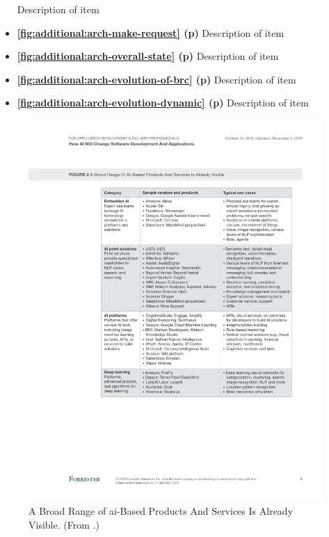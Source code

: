 \begin{itemize}
  Description of item
\item \textbf{\cref{fig:additional:arch-make-request} (p\pageref{fig:additional:arch-make-request})}
  Description of item
\item \textbf{\cref{fig:additional:arch-overall-state} (p\pageref{fig:additional:arch-overall-state})}
  Description of item
\item \textbf{\cref{fig:additional:arch-evolution-of-brc} (p\pageref{fig:additional:arch-evolution-of-brc})}
  Description of item
\item \textbf{\cref{fig:additional:arch-evolution-dynamic} (p\pageref{fig:additional:arch-evolution-dynamic})}
  Description of item
\end{itemize}

\begin{figure}[p!]
\centering
\caption[Categorisation of AI-based products and services]{A Broad Range of \gls{ai}-Based Products And Services Is Already Visible. (From \citep{LoGiudice:2016wf}.)}
\label{fig:introduction:ai-products}
\includegraphics[width=\linewidth]{mainmatter/introduction/figures/ai-products}
\end{figure}

